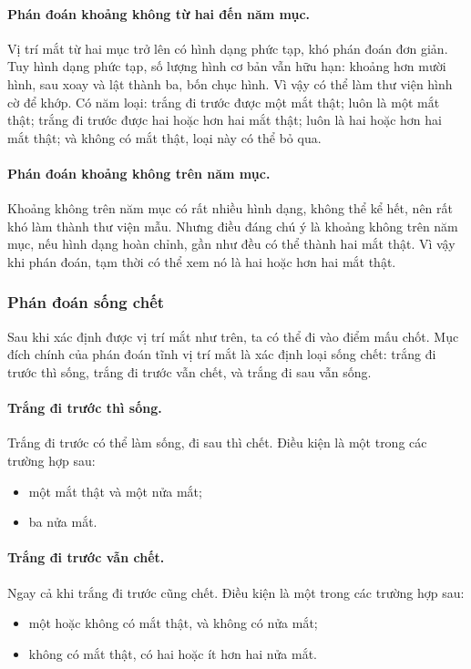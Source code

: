 \documentclass[11pt]{article}
\begin{document}
\paragraph{Phán đoán khoảng không từ hai đến năm mục.}
Vị trí mắt từ hai mục trở lên có hình dạng phức tạp, khó phán đoán đơn giản.
Tuy hình dạng phức tạp, số lượng hình cơ bản vẫn hữu hạn: khoảng hơn mười
hình, sau xoay và lật thành ba, bốn chục hình. Vì vậy có thể làm thư viện
hình cờ để khớp. Có năm loại: trắng đi trước được một mắt thật; luôn là một
mắt thật; trắng đi trước được hai hoặc hơn hai mắt thật; luôn là hai hoặc hơn
hai mắt thật; và không có mắt thật, loại này có thể bỏ qua.

\paragraph{Phán đoán khoảng không trên năm mục.}
Khoảng không trên năm mục có rất nhiều hình dạng, không thể kể hết, nên rất
khó làm thành thư viện mẫu. Nhưng điều đáng chú ý là khoảng không trên năm
mục, nếu hình dạng hoàn chỉnh, gần như đều có thể thành hai mắt thật. Vì vậy
khi phán đoán, tạm thời có thể xem nó là hai hoặc hơn hai mắt thật.

\subsubsection{Phán đoán sống chết}

Sau khi xác định được vị trí mắt như trên, ta có thể đi vào điểm mấu chốt.
Mục đích chính của phán đoán tĩnh vị trí mắt là xác định loại sống chết:
trắng đi trước thì sống, trắng đi trước vẫn chết, và trắng đi sau vẫn sống.

\paragraph{Trắng đi trước thì sống.}
Trắng đi trước có thể làm sống, đi sau thì chết. Điều kiện là một trong các
trường hợp sau:
\begin{itemize}
  \item một mắt thật và một nửa mắt;
  \item ba nửa mắt.
\end{itemize}

\paragraph{Trắng đi trước vẫn chết.}
Ngay cả khi trắng đi trước cũng chết. Điều kiện là một trong các trường hợp
sau:
\begin{itemize}
  \item một hoặc không có mắt thật, và không có nửa mắt;
  \item không có mắt thật, có hai hoặc ít hơn hai nửa mắt.
\end{itemize}
\end{document}
